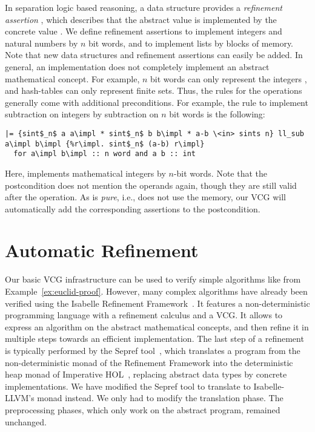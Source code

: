 \documentclass[a4paper,USenglish,cleveref, autoref]{lipics-v2019}
\begin{document}
In separation logic based reasoning, a data structure provides a \emph{refinement assertion} , which describes 
that the abstract value  is implemented by the concrete value . 
We define refinement assertions to implement integers and natural numbers by $n$ bit words, and to implement lists by blocks of memory. 
Note that new data structures and refinement assertions can easily be added. In general, an implementation does not completely implement an abstract mathematical concept.
For example, $n$ bit words can only represent the integers , and hash-tables can only represent finite sets. Thus, the rules for the operations generally come with additional preconditions. 
For example, the rule to implement subtraction on integers by subtraction on $n$ bit words is the following:
\begin{lstlisting}
|= {sint$_n$ a a\impl * sint$_n$ b b\impl * a-b \<in> sints n} ll_sub a\impl b\impl {%r\impl. sint$_n$ (a-b) r\impl}
  for a\impl b\impl :: n word and a b :: int
\end{lstlisting}
Here,  implements mathematical integers by $n$-bit words.
Note that the postcondition does not mention the operands  again, though they are still valid after the operation. 
As  is \emph{pure}, i.e., does not use the memory, our VCG will automatically add the corresponding assertions to the postcondition. 


\section{Automatic Refinement}\label{sec:auto_ref}
Our basic VCG infrastructure can be used to verify simple algorithms like  from Example~\ref{ex:euclid-proof}.
However, many complex algorithms have already been verified using the Isabelle Refinement Framework~\cite{LaTu12}.
It features a non-deterministic programming language with a refinement calculus and a VCG. 
It allows to express an algorithm on the abstract mathematical concepts, and then refine it in multiple steps towards an efficient implementation.
The last step of a refinement is typically performed by the Sepref tool~\cite{La15}, which translates a program from the non-deterministic monad of the Refinement Framework 
into the deterministic heap monad of Imperative HOL~\cite{BKHEM08}, replacing abstract data types by concrete implementations. 
%
We have modified the Sepref tool to translate to Isabelle-LLVM's monad instead.
We only had to modify the translation phase. The preprocessing phases, which only work on the abstract program, remained unchanged.
\end{document}

